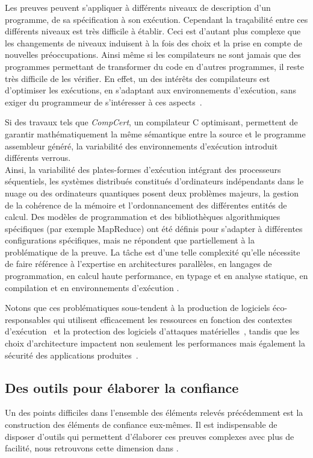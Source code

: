\documentclass[11pt]{article}
\newcommand{\defi}[1]{\cite[défi]{#1}}
\begin{document}
Les preuves peuvent s'appliquer à différents niveaux de description d'un programme, de sa spécification à son exécution. 
Cependant la traçabilité entre ces différents niveaux est très difficile à établir. Ceci est d'autant plus complexe que les changements de niveaux induisent à la fois des choix et la prise en compte de nouvelles préoccupations.
Ainsi même si les compilateurs ne sont jamais que des programmes permettant de transformer du code en d'autres programmes, il reste très difficile de les vérifier. En effet, un des intérêts des compilateurs est d'optimiser les exécutions, en s'adaptant aux environnements d'exécution, sans exiger du programmeur de s'intéresser à ces aspects~\defi{Monniaux}.

Si des travaux tels que \textit{CompCert}, un compilateur C optimisant, permettent de garantir mathématiquement la même sémantique entre la source et le programme assembleur généré, la variabilité des environnements d'exécution introduit différents verrous. \\
Ainsi, la variabilité des  plates-formes d'exécution intégrant des processeurs séquentiels, les systèmes distribués constitués d'ordinateurs indépendants dans le nuage ou des ordinateurs quantiques posent  deux problèmes majeurs, la gestion de la cohérence de la mémoire et l'ordonnancement des différentes entités de calcul. Des modèles de programmation et des bibliothèques algorithmiques spécifiques (par exemple MapReduce) ont été définis pour s'adapter à différentes configurations spécifiques, mais ne répondent que partiellement à la problématique de la preuve. La tâche est d'une telle complexité qu'elle nécessite de faire référence à l'expertise en architectures parallèles, en langages de programmation, en calcul haute performance, en typage et en analyse statique, en compilation et en environnements d'exécution \defi{compilation}.

Notons que ces problématiques sous-tendent à la production de logiciels éco-responsables qui utilisent efficacement les ressources en fonction des contextes d'exécution~\defi{vert} et la protection des logiciels d'attaques matérielles~\defi{Monniaux}, tandis que les choix d'architecture impactent non seulement les performances mais également la sécurité des applications produites~\defi{securite}.




\subsection{Des outils pour élaborer la confiance \label{ss:fiabilite:confiance}}
Un des points difficiles dans l'ensemble des éléments relevés précédemment est la construction des éléments de confiance eux-mêmes. Il est indispensable de disposer d'outils qui permettent d'élaborer ces preuves complexes avec plus de facilité, nous retrouvons cette dimension dans \defi{Monniaux, reconfiguration}.  
\end{document}
